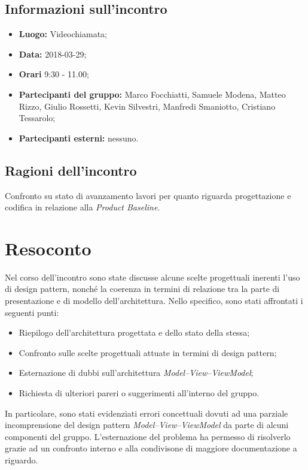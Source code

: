 \documentclass[openany,12pt,a4paper]{article}
\begin{document}
  \subsection{Informazioni sull'incontro} 
   
  \begin{itemize}  
      \item \textbf{Luogo:} Videochiamata;
      \item \textbf{Data:} 2018-03-29; 
      \item \textbf{Orari} 9:30 - 11.00;
      \item \textbf{Partecipanti del gruppo:} Marco Focchiatti, Samuele Modena, Matteo Rizzo, Giulio Rossetti, Kevin Silvestri, Manfredi Smaniotto, Cristiano Tessarolo; 
      \item \textbf{Partecipanti esterni:} nessuno. 
  \end{itemize} 
 
  \subsection{Ragioni dell'incontro} 
  Confronto su stato di avanzamento lavori per quanto riguarda progettazione e codifica in relazione alla \textit{Product Baseline}.
 
  \section{Resoconto} 
  Nel corso dell'incontro sono state discusse alcune scelte progettuali inerenti l'uso di design pattern, nonché la coerenza in termini di relazione tra la parte di presentazione e di modello dell'architettura. Nello specifico, sono stati affrontati i seguenti punti:
	
  \begin{itemize}
	\item Riepilogo dell'architettura progettata e dello stato della stessa;
	\item Confronto sulle scelte progettuali attuate in termini di design pattern;
	\item Esternazione di dubbi sull'architettura \textit{Model–View–ViewModel};
	\item Richiesta di ulteriori pareri o suggerimenti all'interno del gruppo.
  \end{itemize}

  \noindent In particolare, sono stati evidenziati errori concettuali dovuti ad una parziale incomprensione del design pattern \textit{Model–View–ViewModel} da parte di alcuni componenti del gruppo. L'esternazione del problema ha permesso di risolverlo grazie ad un confronto interno e alla condivisone di maggiore documentazione a riguardo. 
 
\end{document}
